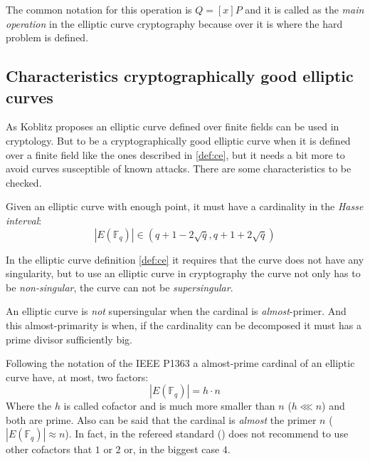 \documentclass[10pt,a4paper,twoside]{llncs}
\newcommand{\EFq}{\ensuremath{E(\mathbb{F}_q)}}%
\begin{document}
The common notation for this operation is $Q = [x ] P$ and it is called as the \emph{main operation} in the elliptic curve cryptography because over it is where the hard problem is defined.

\subsection{Characteristics cryptographically good elliptic curves \label{sec:good_ce}}

As Koblitz proposes \cite{Koblitz87ecc} an elliptic curve defined over finite fields can be used in cryptology. But to be a cryptographically good elliptic curve when it is defined over a finite field like the ones described in \ref{def:ce}, but it needs a bit more to avoid curves susceptible of known attacks. There are some characteristics to be checked.


\begin{definition}\label{def:Hasse}
 Given an elliptic curve with enough point, it must have a cardinality in the \emph{Hasse interval}:
\begin{equation}\label{eq:hasse}
| \EFq | \in \left( q+1-2\sqrt{q} , q+1+2\sqrt{q} \right)
\end{equation}
\end{definition}


In the elliptic curve definition \ref{def:ce} it requires that the curve does not have any singularity, but to use an elliptic curve in cryptography the curve not only has to be \emph{non-singular}, the curve can not be \emph{supersingular}.

\begin{definition}\label{def:nonsupersing}
 An elliptic curve is \emph{not} supersingular when the cardinal is \emph{almost}-primer. And this almost-primarity is when, if the cardinality can be decomposed it must has a prime divisor sufficiently big.
\end{definition}

Following the notation of the IEEE P1363 \cite{P1363} a almost-prime cardinal of an elliptic curve have, at most, two factors:
\begin{equation}\label{amostprime}
| \EFq | = h \cdot n
\end{equation}
Where the $h$ is called cofactor and is much more smaller than $n$ ($h \lll n$) and both are prime. Also can be said that the cardinal is \emph{almost} the primer $n$ ($|\EFq| \approx n$). In fact, in the refereed standard (\cite{P1363}) does not recommend to use other cofactors that $1$ or $2$ or, in the biggest case $4$.
\end{document}

